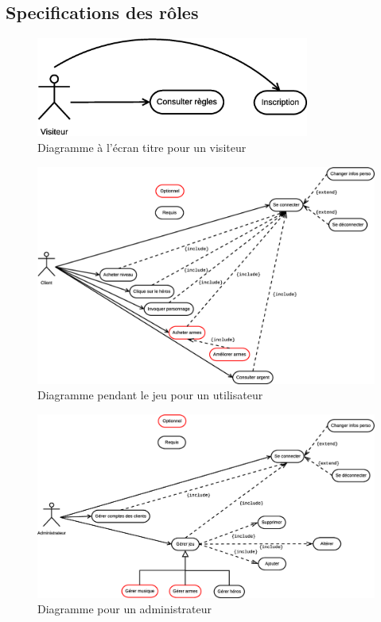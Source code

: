 \subsection{Specifications des rôles}

    \begin{figure}[h!]
        \centering
            \includegraphics[width=0.8\textwidth]{images/utilisation1.eps}
        \caption{Diagramme à l'écran titre pour un visiteur}
    \end{figure}

    \begin{figure}[ht!]
        \centering
            \includegraphics[width=1\textwidth]{images/utilisation2.eps}
        \caption{Diagramme pendant le jeu pour un utilisateur}
    \end{figure}

    \newpage

    \begin{figure}[ht!]
        \centering
            \includegraphics[width=1\textwidth]{images/utilisation3.eps}
        \caption{Diagramme pour un administrateur}
    \end{figure}
